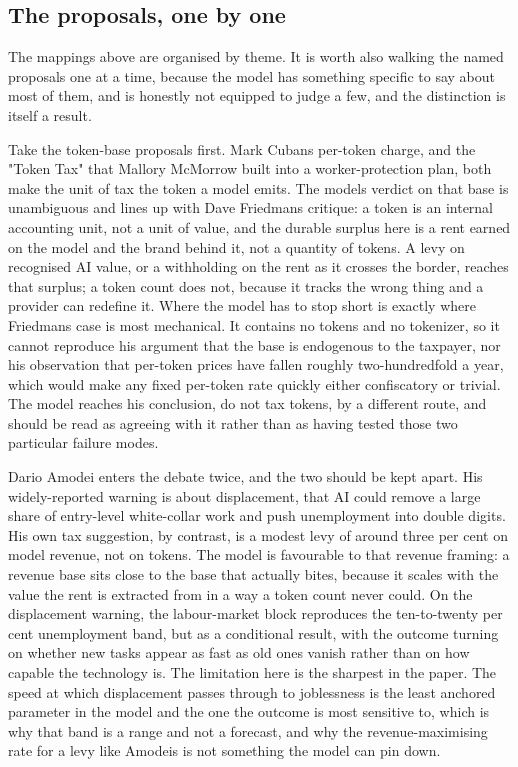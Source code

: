 \documentclass[11pt]{article}
\begin{document}
\hypertarget{the-proposals-one-by-one}{%
\subsection{The proposals, one by one}\label{the-proposals-one-by-one}}

The mappings above are organised by theme. It is worth also walking the
named proposals one at a time, because the model has something specific
to say about most of them, and is honestly not equipped to judge a few,
and the distinction is itself a result.

Take the token-base proposals first. Mark Cuban\textquotesingle s
per-token charge, and the "Token Tax" that Mallory McMorrow built into a
worker-protection plan, both make the unit of tax the token a model
emits. The model\textquotesingle s verdict on that base is unambiguous
and lines up with Dave Friedman\textquotesingle s critique: a token is
an internal accounting unit, not a unit of value, and the durable
surplus here is a rent earned on the model and the brand behind it, not
a quantity of tokens. A levy on recognised AI value, or a withholding on
the rent as it crosses the border, reaches that surplus; a token count
does not, because it tracks the wrong thing and a provider can redefine
it. Where the model has to stop short is exactly where
Friedman\textquotesingle s case is most mechanical. It contains no
tokens and no tokenizer, so it cannot reproduce his argument that the
base is endogenous to the taxpayer, nor his observation that per-token
prices have fallen roughly two-hundredfold a year, which would make any
fixed per-token rate quickly either confiscatory or trivial. The model
reaches his conclusion, do not tax tokens, by a different route, and
should be read as agreeing with it rather than as having tested those
two particular failure modes.

Dario Amodei enters the debate twice, and the two should be kept apart.
His widely-reported warning is about displacement, that AI could remove
a large share of entry-level white-collar work and push unemployment
into double digits. His own tax suggestion, by contrast, is a modest
levy of around three per cent on model revenue, not on tokens. The model
is favourable to that revenue framing: a revenue base sits close to the
base that actually bites, because it scales with the value the rent is
extracted from in a way a token count never could. On the displacement
warning, the labour-market block reproduces the ten-to-twenty per cent
unemployment band, but as a conditional result, with the outcome turning
on whether new tasks appear as fast as old ones vanish rather than on
how capable the technology is. The limitation here is the sharpest in
the paper. The speed at which displacement passes through to joblessness
is the least anchored parameter in the model and the one the outcome is
most sensitive to, which is why that band is a range and not a forecast,
and why the revenue-maximising rate for a levy like
Amodei\textquotesingle s is not something the model can pin down.
\end{document}
